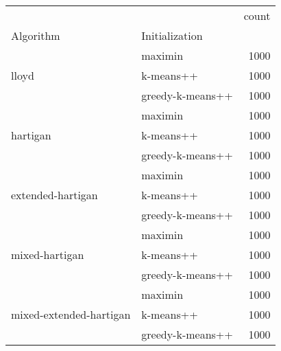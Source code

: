 \begin{tabular}{llr}
\hline
 &  & count \\
Algorithm & Initialization &  \\
\hline
\multirow[t]{3}{*}{lloyd} & maximin & 1000 \\
 & k-means++ & 1000 \\
 & greedy-k-means++ & 1000 \\
\cline{1-3}
\multirow[t]{3}{*}{hartigan} & maximin & 1000 \\
 & k-means++ & 1000 \\
 & greedy-k-means++ & 1000 \\
\cline{1-3}
\multirow[t]{3}{*}{extended-hartigan} & maximin & 1000 \\
 & k-means++ & 1000 \\
 & greedy-k-means++ & 1000 \\
\cline{1-3}
\multirow[t]{3}{*}{mixed-hartigan} & maximin & 1000 \\
 & k-means++ & 1000 \\
 & greedy-k-means++ & 1000 \\
\cline{1-3}
\multirow[t]{3}{*}{mixed-extended-hartigan} & maximin & 1000 \\
 & k-means++ & 1000 \\
 & greedy-k-means++ & 1000 \\
\cline{1-3}
\hline
\end{tabular}
